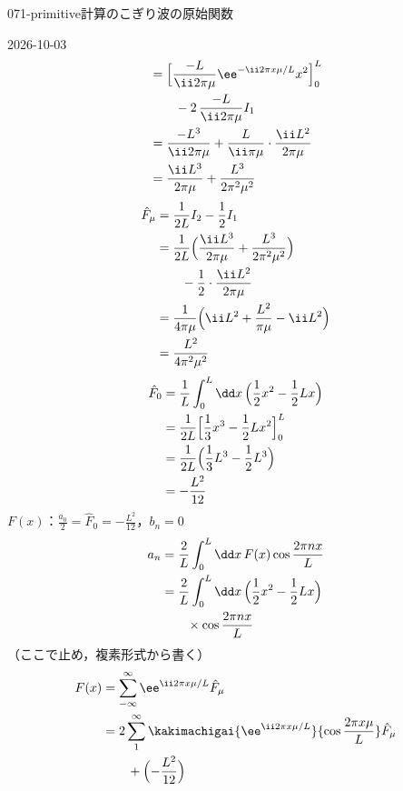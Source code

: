 \documentclass[uplatex,dvipdfmx,a4paper,11pt]{jsarticle}
\begin{document}
\begin{mondai}{071-primitive}{計算}{のこぎり波の原始関数}
\begin{kotaeutsushi}{2026-10-03}
\begin{align*}
  &=\Bigl[\frac{-L}{\ii2\pi\mu}\ee^{-\ii2\pi x\mu/L}x^{2}\Bigr]_{0}^{L}\\
  &\qquad-2\,\frac{-L}{\ii2\pi\mu}I_1\\
  &=\frac{-L^{3}}{\ii2\pi\mu}+\frac{L}{\ii\pi\mu}\cdot\frac{\ii L^{2}}{2\pi\mu}\\
  &=\frac{\ii L^{3}}{2\pi\mu}+\frac{L^{3}}{2\pi^{2}\mu^{2}}
\end{align*}
\begin{align*}
  \hat{F}_{\mu}&=\frac{1}{2L}I_2-\frac{1}{2}I_1\\
  &=\frac{1}{2L}\Bigl(\frac{\ii L^{3}}{2\pi\mu}+\frac{L^{3}}{2\pi^{2}\mu^{2}}\Bigr)\\
  &\qquad-\frac{1}{2}\cdot\frac{\ii L^{2}}{2\pi\mu}\\
  &=\frac{1}{4\pi\mu}\Bigl(\ii L^{2}+\frac{L^{2}}{\pi\mu}-\ii L^{2}\Bigr)\\
  &=\frac{L^{2}}{4\pi^{2}\mu^{2}}
\end{align*}
\begin{align*}
  \hat{F}_0&=\frac{1}{L}\int_{0}^{L}\dd x\,\Bigl(\frac{1}{2}x^{2}-\frac{1}{2}Lx\Bigr)\\
  &=\frac{1}{2L}\Bigl[\frac{1}{3}x^{3}-\frac{1}{2}Lx^{2}\Bigr]_{0}^{L}\\
  &=\frac{1}{2L}\Bigl(\frac{1}{3}L^{3}-\frac{1}{2}L^{3}\Bigr)\\
  &=-\frac{L^{2}}{12}
\end{align*}
$F(x)$：$\frac{a_0}{2}=\hat{F}_0=-\frac{L^{2}}{12}$，$b_n=0$
\begin{align*}
  a_n&=\frac{2}{L}\int_{0}^{L}\dd x\,F(x)\cos\frac{2\pi nx}{L}\\
  &=\frac{2}{L}\int_{0}^{L}\dd x\,\Bigl(\frac{1}{2}x^{2}-\frac{1}{2}Lx\Bigr)\\
  &\qquad\times\cos\frac{2\pi nx}{L}
\end{align*}
（ここで止め，複素形式から書く）
\begin{align*}
  F(x)&=\sum_{-\infty}^{\infty}\ee^{\ii2\pi x\mu/L}\hat{F}_{\mu}\\
  &=2\sum_{1}^{\infty}\kakimachigai{\ee^{\ii2\pi x\mu/L}}{\cos\frac{2\pi x\mu}{L}}\hat{F}_{\mu}\\
  &\qquad+\Bigl(-\frac{L^{2}}{12}\Bigr)\\

\end{align*}
\end{kotaeutsushi}
\end{mondai}
\end{document}
